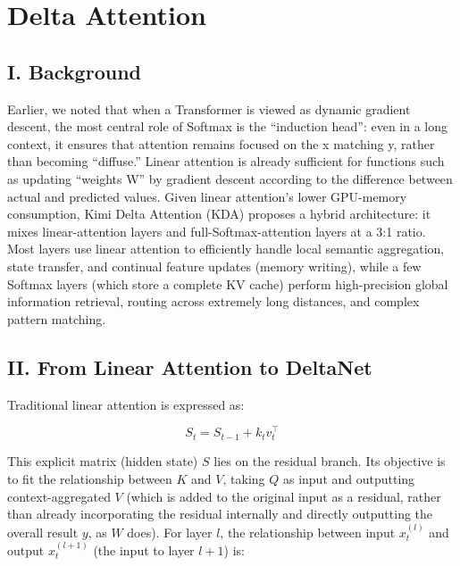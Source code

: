 \setcounter{section}{8}

\hypertarget{delta-attention}{%
\section{Delta Attention}\label{delta-attention}}

\hypertarget{i.-background-2}{%
\subsection{I. Background}\label{i.-background-2}}

Earlier, we noted that when a Transformer is viewed as dynamic gradient descent, the most central role of Softmax is the ``induction head'': even in a long context, it ensures that attention remains focused on the x matching y, rather than becoming ``diffuse.'' Linear attention is already sufficient for functions such as updating ``weights W'' by gradient descent according to the difference between actual and predicted values. Given linear attention's lower GPU-memory consumption, Kimi Delta Attention (KDA) proposes a hybrid architecture: it mixes linear-attention layers and full-Softmax-attention layers at a 3:1 ratio. Most layers use linear attention to efficiently handle local semantic aggregation, state transfer, and continual feature updates (memory writing), while a few Softmax layers (which store a complete KV cache) perform high-precision global information retrieval, routing across extremely long distances, and complex pattern matching.

\hypertarget{ii.-from-linear-attention-to-deltanet}{%
\subsection{II. From Linear Attention to DeltaNet}\label{ii.-from-linear-attention-to-deltanet}}

Traditional linear attention is expressed as:

\[
S_t=S_{t-1}+k_tv_t^\top
\]

This explicit matrix (hidden state) \(S\) lies on the residual branch. Its objective is to fit the relationship between \(K\) and \(V\), taking \(Q\) as input and outputting context-aggregated \(V\) (which is added to the original input as a residual, rather than already incorporating the residual internally and directly outputting the overall result \(y\), as \(W\) does). For layer \(l\), the relationship between input \(x_t^{(l)}\) and output \(x_t^{(l+1)}\) (the input to layer \(l+1\)) is:


